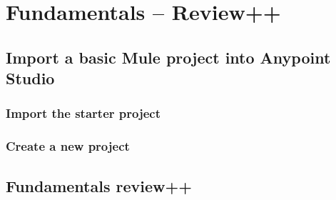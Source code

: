 \chapter{Fundamentals -- Review++}

\section{Import a basic Mule project into Anypoint Studio}

\subsection{Import the starter project}

\subsection{Create a new project}

\section{Fundamentals review++}
